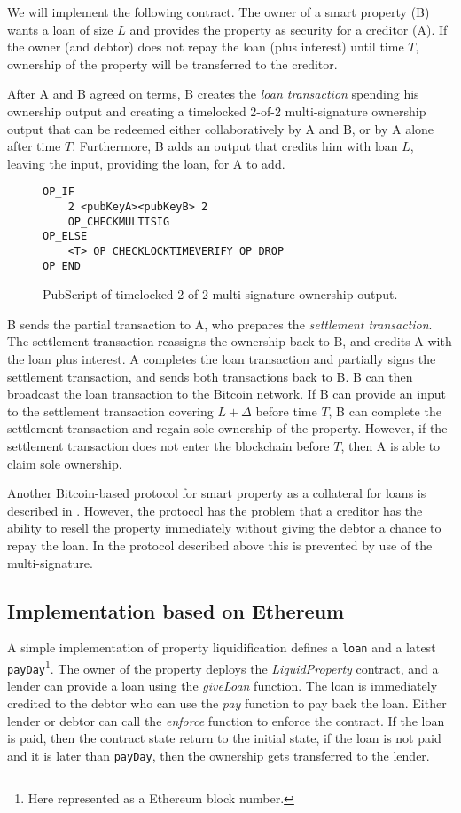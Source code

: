 {We will implement the following contract. The owner of a smart property (B) wants a loan of size $L$ and provides the property as security for a creditor (A). If the owner (and debtor) does not repay the loan (plus interest) until time $T$, ownership of the property will be transferred to the creditor.

After A and B agreed on terms, B creates the \emph{loan transaction} spending his ownership output and creating a timelocked 2-of-2 multi-signature ownership output that can be redeemed either collaboratively by A and B, or by A alone after time $T$. Furthermore, B adds an output that credits him with loan $L$, leaving the input, providing the loan, for A to add. 
\begin{figure}
\begin{lstlisting}
OP_IF 
    2 <pubKeyA><pubKeyB> 2
    OP_CHECKMULTISIG
OP_ELSE
    <T> OP_CHECKLOCKTIMEVERIFY OP_DROP
OP_END    
\end{lstlisting}
\caption{PubScript of timelocked 2-of-2 multi-signature ownership output.}
\end{figure}

B sends the partial transaction to A, who prepares the \emph{settlement transaction}. The settlement transaction reassigns the ownership back to B, and credits A with the loan plus interest. A completes the loan transaction and partially signs the settlement transaction, and sends both transactions back to B. B can then broadcast the loan transaction to the Bitcoin network. 
If B can provide an input to the settlement transaction covering $L+\Delta$ before time $T$, B can complete the settlement transaction and regain sole ownership of the property. However, if the settlement transaction does not enter the blockchain before $T$, then A is able to claim sole ownership.

Another Bitcoin-based protocol for smart property as a collateral for loans is described in \cite{smartproperty2011}. However, the protocol has the problem that a creditor has the ability to resell the property immediately without giving the debtor a chance to repay the loan. In the protocol described above this is prevented by use of the multi-signature. 

\subsection{Implementation based on Ethereum}

A simple implementation of property liquidification defines a \texttt{loan} and a latest \texttt{payDay}\footnote{Here represented as a Ethereum block number.}. The owner of the property deploys the \emph{LiquidProperty} contract, and a lender can provide a loan using the \emph{giveLoan} function. The loan is immediately credited to the debtor who can use the \emph{pay} function to pay back the loan. Either lender or debtor can call the \emph{enforce} function to enforce the contract. If the loan is paid, then the contract state return to the initial state, if the loan is not paid and it is later than \texttt{payDay}, then the ownership gets transferred to the lender.

}
